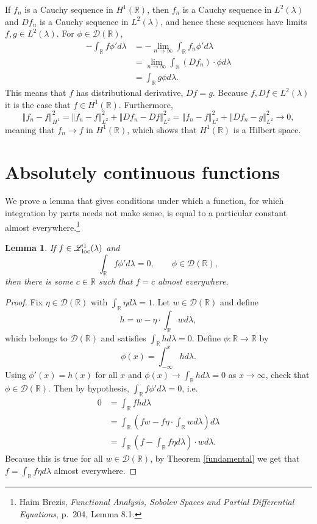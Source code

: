 \documentclass{article}
\newcommand{\Lsemiloc}{\mathscr{L}_{\ensuremath\mathrm{loc}}^1(\lambda)}
\newcommand{\norm}[1]{\left\Vert #1 \right\Vert}
\newtheorem{lemma}[theorem]{Lemma}
\theoremstyle{definition}
\begin{document}
If $f_n$ is a Cauchy sequence in $H^1(\mathbb{R})$, then $f_n$ is a Cauchy sequence in $L^2(\lambda)$
and $Df_n$ is a Cauchy sequence in $L^2(\lambda)$, and hence these sequences have limits $f,g \in L^2(\lambda)$. 
For $\phi \in \mathscr{D}(\mathbb{R})$,
\begin{align*}
-\int_\mathbb{R} f \phi' d\lambda&=-\lim_{n \to \infty} \int_\mathbb{R} f_n \phi' d\lambda\\
&=\lim_{n \to \infty} \int_\mathbb{R} (Df_n)\cdot \phi d\lambda\\
&=\int_\mathbb{R} g \phi d\lambda.
\end{align*}
This means that $f$ has distributional derivative, $Df=g$. Because $f,Df \in L^2(\lambda)$ it is the case that
$f \in H^1(\mathbb{R})$. 
Furthermore,
\[
\norm{f_n-f}_{H^1}^2 = \norm{f_n-f}_{L^2}^2+ \norm{Df_n-Df}_{L^2}^2
=\norm{f_n-f}_{L^2}^2+ \norm{Df_n-g}_{L^2}^2
\to 0,
\]
meaning that $f_n \to f$ in $H^1(\mathbb{R})$, which shows that $H^1(\mathbb{R})$ is a Hilbert space. 



\section{Absolutely continuous functions}



We prove a lemma that gives conditions under which a function, for which integration by parts needs not make sense, is equal to a particular constant almost everywhere.\footnote{Haim Brezis, {\em Functional Analysis, Sobolev Spaces and Partial Differential Equations}, p.~204, Lemma 8.1.}


\begin{lemma}
If $f \in \Lsemiloc$ and 
\[
\int_\mathbb{R} f \phi' d\lambda = 0,\qquad \phi \in \mathscr{D}(\mathbb{R}),
\]
then there is some $c \in \mathbb{R}$ such that $f=c$ almost everywhere.
\label{constant}
\end{lemma}
\begin{proof}
Fix $\eta \in \mathscr{D}(\mathbb{R})$ with $\int_\mathbb{R} \eta d\lambda = 1$. Let 
$w \in \mathscr{D}(\mathbb{R})$ and define
\[
h = w - \eta \cdot \int_\mathbb{R} w d\lambda,
\]
which belongs to $\mathscr{D}(\mathbb{R})$ and satisfies $\int_\mathbb{R} h d\lambda = 0$. 
Define $\phi:\mathbb{R} \to \mathbb{R}$ by
\[
\phi(x) = \int_{-\infty}^x h d\lambda.
\]
Using  $\phi'(x)=h(x)$ for all $x$ and 
$\phi(x) \to \int_\mathbb{R} h d\lambda=0$ as $x \to \infty$, check that
$\phi \in \mathscr{D}(\mathbb{R})$. Then by hypothesis, $\int_\mathbb{R} f \phi' d\lambda =0$, i.e.
\begin{align*}
0& = \int_\mathbb{R} f h d\lambda\\
& = \int_\mathbb{R} \left(fw - f\eta \cdot \int_\mathbb{R} w d\lambda\right) d\lambda\\
&=\int_\mathbb{R} \left( f - \int_\mathbb{R} f \eta d\lambda \right) \cdot w d\lambda.
\end{align*}
Because this is true for all $w \in \mathscr{D}(\mathbb{R})$, by Theorem \ref{fundamental} we get that
$f=\int_\mathbb{R} f \eta d\lambda$ almost everywhere. 
\end{proof}
\end{document}
